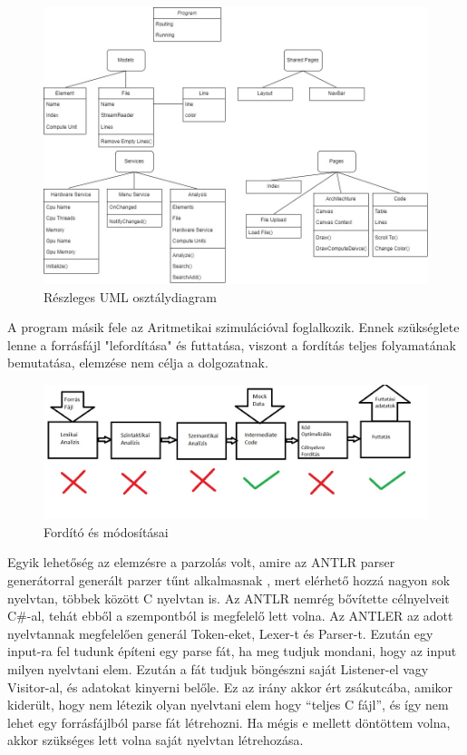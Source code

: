 \begin{figure}[h!]
\centering
\includegraphics[width=\textwidth]{images/UML.jpg}
\caption{Részleges UML osztálydiagram}
\label{fig:uml}
\end{figure}

A program másik fele az Aritmetikai szimulációval foglalkozik. Ennek szükséglete lenne a forrásfájl "lefordítása" és futtatása, viszont a fordítás teljes folyamatának bemutatása, elemzése nem célja a dolgozatnak.

\begin{figure}[h!]
\centering
\includegraphics[width=\textwidth]{images/Compiler.jpg}
\caption{Fordító és módosításai}
\label{fig:compiler}
\end{figure}

Egyik lehetőség az elemzésre a parzolás volt, amire az ANTLR parser generátorral generált parzer tűnt alkalmasnak \cite{antlr}, mert elérhető hozzá nagyon sok nyelvtan, többek között C nyelvtan is. Az ANTLR nemrég bővítette célnyelveit C{\#}-al, tehát ebből a szempontból is megfelelő lett volna. Az ANTLER az adott nyelvtannak megfelelően generál Token-eket, Lexer-t és Parser-t. Ezután egy input-ra fel tudunk építeni egy parse fát, ha meg tudjuk mondani, hogy az input milyen nyelvtani elem. Ezután a fát tudjuk böngészni saját Listener-el vagy Visitor-al, és adatokat kinyerni belőle. Ez az irány akkor ért zsákutcába, amikor kiderült, hogy nem létezik olyan nyelvtani elem hogy “teljes C fájl”, és így nem lehet egy forrásfájlból parse fát létrehozni. Ha mégis e mellett döntöttem volna, akkor szükséges lett volna saját nyelvtan létrehozása.

